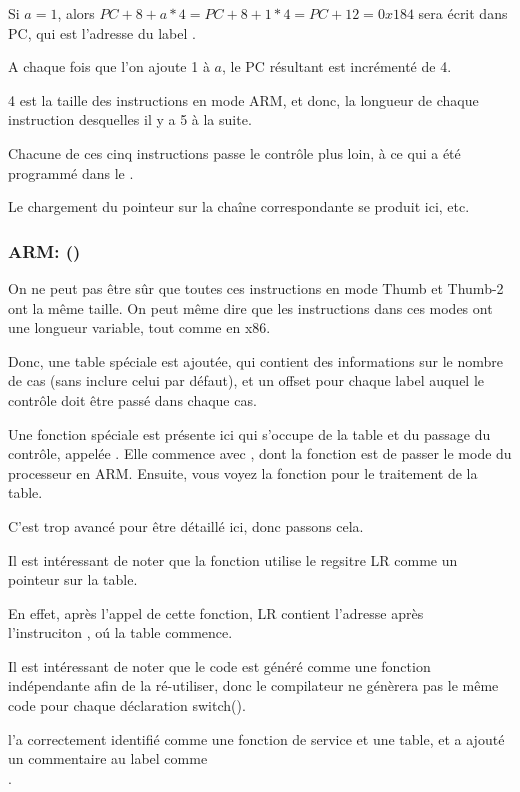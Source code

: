 Si $a=1$, alors $PC+8+a*4 = PC+8+1*4 = PC+12 = 0x184$ sera écrit dans \ac{PC}, qui
est l'adresse du label .

A chaque fois que l'on ajoute 1 à $a$, le \ac{PC} résultant est incrémenté de
4.

4 est la taille des instructions en mode ARM, et donc, la longueur de chaque instruction
 desquelles il y a 5 à la suite.

Chacune de ces cinq instructions  passe le contrôle plus loin, à ce qui a
été programmé dans le .

Le chargement du pointeur sur la chaîne correspondante se produit ici, etc.

\subsubsection{ARM: \OptimizingKeilVI (\ThumbMode)}




On ne peut pas être sûr que toutes ces instructions en mode Thumb et Thumb-2 ont
la même taille. On peut même dire que les instructions dans ces modes ont une longueur
variable, tout comme en x86.


Donc, une table spéciale est ajoutée, qui contient des informations sur le nombre
de cas (sans inclure celui par défaut), et un offset pour chaque label auquel le
contrôle doit être passé dans chaque cas.


Une fonction spéciale est présente ici qui s'occupe de la table et du passage du
contrôle, appelée .
Elle commence avec , dont la fonction est de passer le mode du processeur
en ARM.
Ensuite, vous voyez la fonction pour le traitement de la table.

C'est trop avancé pour être détaillé ici, donc passons cela.


Il est intéressant de noter que la fonction utilise le regsitre \ac{LR} comme un
pointeur sur la table.

En effet, après l'appel de cette fonction, \ac{LR} contient l'adresse après\\
l'instruciton , oú la table commence.

Il est intéressant de noter que le code est généré comme une fonction indépendante
afin de la ré-utiliser, donc le compilateur ne génèrera pas le même code pour chaque
déclaration switch().

\IDA l'a correctement identifié comme une fonction de service et une table, et a
ajouté un commentaire au label comme\\
.

